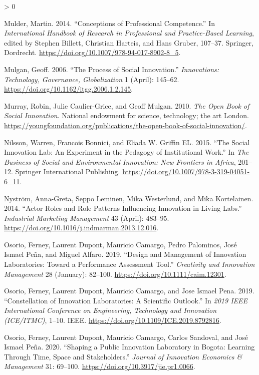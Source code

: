 \documentclass[AMA,STIX1COL,APA,STIX2COL]{WileyNJD-v2}
\newlength{\cslhangindent}
\newenvironment{CSLReferences}[2] %
 {%
  \setlength{\parindent}{0pt}
  \ifodd #1 \everypar{\setlength{\hangindent}{\cslhangindent}}\ignorespaces\fi
  \ifnum #2 > 0
  \setlength{\parskip}{#2\baselineskip}
  \fi
 }%
 {}
\begin{document}
\begin{CSLReferences}{1}{0}
\leavevmode\hypertarget{ref-Mulder2014}{}%
Mulder, Martin. 2014. {``Conceptions of Professional Competence.''} In
\emph{International Handbook of Research in Professional and
Practice-Based Learning}, edited by Stephen Billett, Christian Harteis,
and Hans Gruber, 107--37. Springer, Dordrecht.
\url{https://doi.org/10.1007/978-94-017-8902-8_5}.

\leavevmode\hypertarget{ref-Mulgan2006}{}%
Mulgan, Geoff. 2006. {``The Process of Social Innovation.''}
\emph{Innovations: Technology, Governance, Globalization} 1 (April):
145--62. \url{https://doi.org/10.1162/itgg.2006.1.2.145}.

\leavevmode\hypertarget{ref-Murray2010}{}%
Murray, Robin, Julie Caulier-Grice, and Geoff Mulgan. 2010. \emph{The
Open Book of Social Innovation}. National endowment for science,
technology; the art London.
\url{https://youngfoundation.org/publications/the-open-book-of-social-innovation/}.

\leavevmode\hypertarget{ref-Nilsson2015}{}%
Nilsson, Warren, Francois Bonnici, and Eliada W. Griffin EL. 2015.
{``The Social Innovation Lab: An Experiment in the Pedagogy of
Institutional Work.''} In \emph{The Business of Social and Environmental
Innovation: New Frontiers in Africa}, 201--12. Springer International
Publishing. \url{https://doi.org/10.1007/978-3-319-04051-6_11}.

\leavevmode\hypertarget{ref-Nystrom2014}{}%
Nyström, Anna-Greta, Seppo Leminen, Mika Westerlund, and Mika
Kortelainen. 2014. {``Actor Roles and Role Patterns Influencing
Innovation in Living Labs.''} \emph{Industrial Marketing Management} 43
(April): 483--95. \url{https://doi.org/10.1016/j.indmarman.2013.12.016}.

\leavevmode\hypertarget{ref-Osorio2019}{}%
Osorio, Ferney, Laurent Dupont, Mauricio Camargo, Pedro Palominos, José
Ismael Peña, and Miguel Alfaro. 2019. {``Design and Management of
Innovation Laboratories: Toward a Performance Assessment Tool.''}
\emph{Creativity and Innovation Management} 28 (January): 82--100.
\url{https://doi.org/10.1111/caim.12301}.

\leavevmode\hypertarget{ref-Osorio2019-A}{}%
Osorio, Ferney, Laurent Dupont, Mauricio Camargo, and Jose Ismael Pena.
2019. {``Constellation of Innovation Laboratories: A Scientific
Outlook.''} In \emph{2019 IEEE International Conference on Engineering,
Technology and Innovation (ICE/ITMC)}, 1--10. IEEE.
\url{https://doi.org/10.1109/ICE.2019.8792816}.

\leavevmode\hypertarget{ref-Osorio2020}{}%
Osorio, Ferney, Laurent Dupont, Mauricio Camargo, Carlos Sandoval, and
José Ismael Peña. 2020. {``Shaping a Public Innovation Laboratory in
Bogota: Learning Through Time, Space and Stakeholders.''} \emph{Journal
of Innovation Economics \& Management} 31: 69--100.
\url{https://doi.org/10.3917/jie.pr1.0066}.


\end{CSLReferences}
\end{document}

